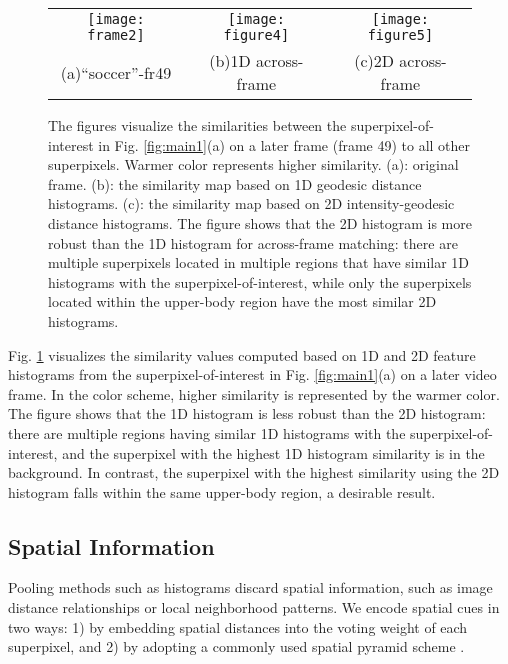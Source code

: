 \documentclass[runningheads]{llncs}
\begin{document}
\begin{figure}[!t]
\begin{center}
\begin{adjustbox}{max width=0.9\textwidth}
\begin{tabular}{ccc}
\texttt{[image: frame2]}&
\texttt{[image: figure4]}&
\texttt{[image: figure5]}\\
(a)``soccer''-fr49&(b)1D across-frame&(c)2D across-frame\\
\end{tabular}
\end{adjustbox}
\end{center}
\caption{The figures visualize the similarities between the superpixel-of-interest in Fig. \ref{fig:main1}(a) on a later frame (frame 49) to all other superpixels. Warmer color represents higher similarity. (a): original frame. (b): the similarity map based on 1D geodesic distance histograms. (c): the similarity map based on 2D intensity-geodesic distance histograms. The figure shows that the 2D histogram is more robust than the 1D histogram for across-frame matching: there are multiple superpixels located in multiple regions that have similar 1D histograms with the superpixel-of-interest, while only the superpixels located within the upper-body region have the most similar 2D histograms.}
\label{fig:betweenfr}
\end{figure}

Fig. \ref{fig:betweenfr} visualizes the similarity values computed based on 1D and 2D feature histograms from the superpixel-of-interest in Fig. \ref{fig:main1}(a) on a later video frame. In the color scheme,  higher similarity is represented by the warmer color. The figure shows that the 1D histogram is less robust than the 2D histogram: there are multiple regions having similar 1D histograms with the superpixel-of-interest, and the superpixel with the highest 1D histogram similarity is in the background. In contrast, the superpixel with the highest similarity using the 2D histogram falls within the same upper-body region,  a desirable result.

\subsection{Spatial Information}
\label{sec:33}
Pooling methods such as histograms discard spatial information, such as image distance relationships or local neighborhood patterns. We encode spatial cues in two ways: 1) by embedding spatial distances into the voting weight of each superpixel, and 2) by adopting a commonly used spatial pyramid scheme \cite{1641019}.
\end{document}
